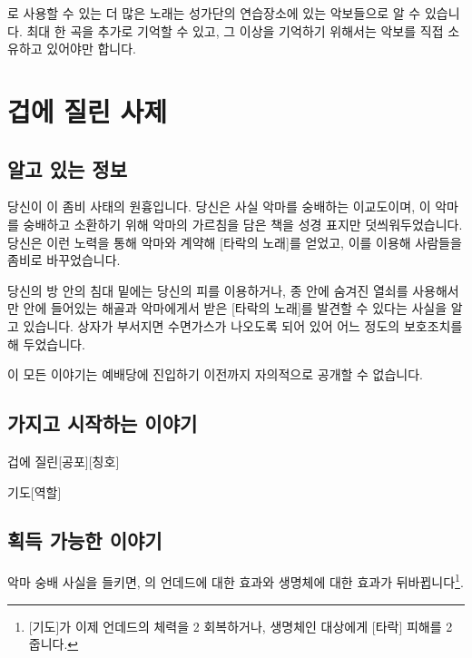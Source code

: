 \documentclass{report}
\begin{document}
			\bigskip
			
			로 사용할 수 있는 더 많은 노래는 성가단의 연습장소에 있는 악보들으로 알 수 있습니다. 최대 한 곡을 추가로 기억할 수 있고, 그 이상을 기억하기 위해서는 악보를 직접 소유하고 있어야만 합니다.
	
	
	
	
	
	\pagebreak \hypertarget{cowardly-priest}{}
	\section{겁에 질린 사제}
		\subsection*{알고 있는 정보}
			당신이 이 좀비 사태의 원흉입니다. 당신은 사실 악마를 숭배하는 이교도이며, 이 악마를 숭배하고 소환하기 위해 악마의 가르침을 담은 책을 성경 표지만 덧씌워두었습니다. 당신은 이런 노력을 통해 악마와 계약해 [타락의 노래]를 얻었고, 이를 이용해 사람들을 좀비로 바꾸었습니다.
			
			당신의 방 안의 침대 밑에는 당신의 피를 이용하거나, 종 안에 숨겨진 열쇠를 사용해서만 안에 들어있는 해골과 악마에게서 받은 [타락의 노래]를 발견할 수 있다는 사실을 알고 있습니다. 상자가 부서지면 수면가스가 나오도록 되어 있어 어느 정도의 보호조치를 해 두었습니다.
			
			이 모든 이야기는 예배당에 진입하기 이전까지 자의적으로 공개할 수 없습니다.
			
		\subsection*{가지고 시작하는 이야기}
			\begin{spoiler}{겁에 질린}{[공포][칭호]}
				
			\end{spoiler}
			
			\begin{spoiler}{기도}{[역할]}
			\end{spoiler}
		
		\subsection*{획득 가능한 이야기}
			악마 숭배 사실을 들키면, 의 언데드에 대한 효과와 생명체에 대한 효과가 뒤바뀝니다\footnote{[기도]가 이제 언데드의 체력을 2 회복하거나, 생명체인 대상에게 [타락] 피해를 2 줍니다.}.
			
\end{document}
